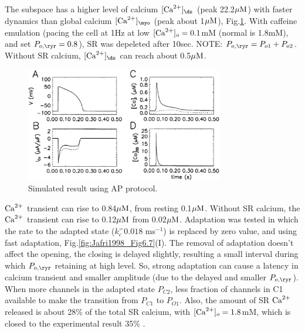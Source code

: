 The subspace has a higher level of calcium $[\Ca]_\ds$ (peak 22.2${\mu\text{M}}$) with
faster dynamics than global calcium $[\Ca]_\myo$ (peak about 1${\mu\text{M}}$),
Fig.\ref{fig:Jafri1998_Fig5}. With caffeine emulation (pacing the cell at 1Hz at
low $[{\text{Ca}^{2+}}]_o=0.1$mM (normal is 1.8mM), and set $P_{o,\ryr}=0.8$), SR was
depeleted after 10sec. NOTE: $P_{o,\ryr}=P_{o1}+P_{o2}$. Without SR calcium,
$[\Ca]_\ds$ can reach about 0.5${\mu\text{M}}$.

\begin{figure}[hbt]
  \centerline{\includegraphics[height=5cm]{./images/Jafri1998_Fig5.eps}}
  \caption{Simulated result using AP protocol.}
  \label{fig:Jafri1998_Fig5}
\end{figure}

${\text{Ca}^{2+}}$ transient can rise to 0.84${\mu\text{M}}$, from resting 0.1${\mu\text{M}}$. Without SR
calcium, the ${\text{Ca}^{2+}}$ transient can rise to 0.12${\mu\text{M}}$ from 0.02${\mu\text{M}}$.
Adaptation was tested in which the rate to the adapted state ($k_c^=0.018$
ms$^{-1}$) is replaced by zero value, and using fast adaptation,
Fig.\ref{fig:Jafri1998_Fig6.7}(I).
The removal of adaptation doesn't affect the opening, the closing is delayed
slightly, resulting a small interval during which $P_{o,\ryr}$ retaining at high
level. So, strong adaptation can cause a latency in calcium transient and
smaller amplitude (due to the delayed and smaller $P_{o,\ryr}$).  When more
channels in the adapted state $P_{C2}$, less fraction of channels in C1
available to make the transition from $P_{C1}$ to $P_{O1}$.
Also, the amount of SR ${\text{Ca}^{2+}}$ released is about 28\% of the
total SR calcium, with $[{\text{Ca}^{2+}}]_o=1.8$mM, which is closed to the experimental
result 35\% \citep{bassani1995fsr}.

